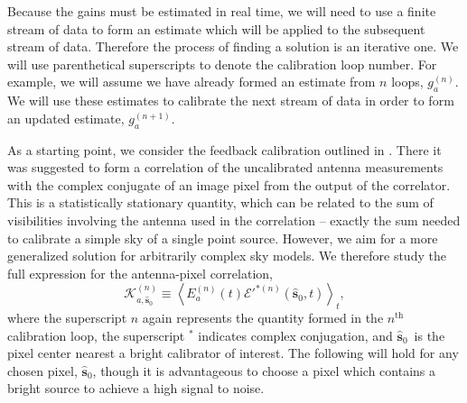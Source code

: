\documentclass[a4paper,fleqn,usenatbib]{mnras}
\newcommand{\spix}{\ensuremath{\hat{\mathbf{s}}_{0}}}
\newcommand{\Kna}[1][n]{\ensuremath{\mathcal{K}^{(#1)}_{a,\spix}}}
\begin{document}
Because the gains must be estimated in real time, we will need to use a finite stream of data to 
form an estimate which will be applied to the subsequent stream of data. Therefore the 
process of finding a solution is an iterative one. We will use parenthetical superscripts to 
denote the calibration loop number. For example, we will assume we have already formed an 
estimate from $n$ loops, $g^{(n)}_a$. We will use these estimates to calibrate the next stream 
of data in order to form an updated estimate, $g^{(n+1)}_a$.

As a starting point, we consider the feedback calibration outlined in \citealt{mor11}. There it 
was suggested to form a correlation of the uncalibrated antenna measurements with the complex conjugate of an image 
pixel from the output of the correlator. This is a statistically stationary quantity, which can be 
related to the sum of visibilities involving the antenna used in the correlation -- exactly the sum 
needed to calibrate a simple sky of a single point source. However, we aim for a more 
generalized solution for arbitrarily complex sky models. We therefore study the full expression 
for the antenna-pixel correlation,
\begin{equation}\label{eq:Kna_def}
\Kna \equiv \left<E_a^{(n)}(t) \mathcal{E}'^{*(n)}(\spix,t)\right>_t,
\end{equation}
where the superscript $n$ again represents the quantity formed in the $n^\mathrm{th}$ 
calibration loop, 
the superscript $^*$ indicates complex conjugation,
and \spix\, is the pixel center nearest a bright calibrator of interest. The 
following will hold for any chosen pixel, \spix, though it is advantageous to choose a pixel which 
contains a bright source to achieve a high signal to noise. 
\end{document}
